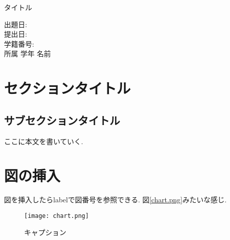 \documentclass{jarticle}
\begin{document}
\centering
  タイトル

\raggedrigh
  出題日:\\
  提出日:\\
  学籍番号:\\
  所属 学年 名前

\section{セクションタイトル}

\subsection{サブセクションタイトル}

ここに本文を書いていく.

\section{図の挿入}

図を挿入したらlabelで図番号を参照できる.
図\ref{chart.png}みたいな感じ.

\centering
  \begin{figure}[htbp]
    \texttt{[image: chart.png]}
    \caption{キャプション}
    \label{chart}
  \end{figure}
\end{document}
